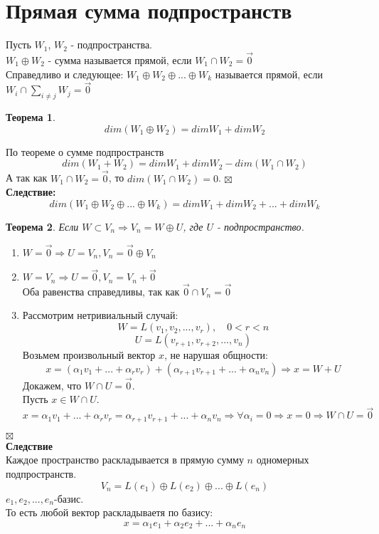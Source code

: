 \documentclass[a4paper, 12pt]{report}
\newtheorem*{theorem}{Теорема}
\newenvironment{Proof}
{\par\noindent{$\blacklozenge$}}
{\hfill$\scriptstyle\boxtimes$}
\begin{document}
\section{Прямая сумма подпространств}
Пусть $W_1$, $W_2$ - подпространства.\\
$W_1 \oplus W_2$ - сумма называется прямой, если $W_1 \cap W_2 = \vec0$\\
Справедливо и следующее: $W_1 \oplus W_2 \oplus ... \oplus W_k$ называется прямой, если $W_i \cap \sum\limits_{i \neq j} W_j = \vec 0$
\begin{theorem}
    $$dim(W_1 \oplus W_2) = dimW_1 + dimW_2$$
\end{theorem}
\begin{Proof}
    По теореме о сумме подпространств $$dim(W_1+W_2)=dimW_1+dimW_2-dim(W_1 \cap W_2)$$
    А так как $W_1 \cap W_2 = \vec0$, то $dim(W_1 \cap W_2)=0$.
\end{Proof}\\
\textbf{Следствие:}
    $$dim(W_1 \oplus W_2 \oplus ... \oplus W_k) = dimW_1 + dimW_2 + ... + dimW_k$$
\begin{theorem}
    Если $W \subset V_n \Rightarrow V_n = W \oplus U$, где $U$ - подпространство.
\end{theorem} 
\begin{Proof}
    \begin{enumerate}
        \item $W = \vec0 \Rightarrow U = V_n, V_n = \vec0 \oplus V_n$
        \item $W = V_n \Rightarrow U = \vec0, V_n = V_n + \vec0$\\
        Оба равенства справедливы, так как $\vec0 \cap V_n = \vec0$
        \item Рассмотрим нетривиальный случай:
        $$W = L(v_1, v_2,...,v_r), \quad 0<r<n$$
        $$U = L(v_{r+1},v_{r+2},...,v_n)$$
        Возьмем произвольный вектор $x$, не нарушая общности:
        $$x=(\alpha_1v_1+...+\alpha_rv_r)+(\alpha_{r+1}v_{r+1}+...+\alpha_nv_n) \Rightarrow x=W+U$$
        Докажем, что $W \cap U = \vec0$.\\
        Пусть $x \in W \cap U$.
        $$x=\alpha_1v_1+...+\alpha_rv_r=\alpha_{r+1}v_{r+1}+...+\alpha_nv_n \Rightarrow \forall \alpha_i = 0 \Rightarrow x = 0 \Rightarrow W \cap U = \vec0$$
    \end{enumerate}
\end{Proof}\\
\textbf{Следствие}\\
Каждое пространство раскладывается в прямую сумму $n$ одномерных подпространств.
$$V_n=L(e_1) \oplus L(e_2) \oplus ... \oplus L(e_n)$$ 
$e_1,e_2, ... ,e_n$-базис.\\
То есть любой вектор раскладываетя по базису:
$$x=\alpha_1e_1+\alpha_2e_2+ ... + \alpha_ne_n$$
\end{document}
